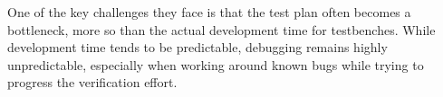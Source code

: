 One of the key challenges they face is that the test plan often becomes a bottleneck, more so than the actual
development time for testbenches. While development time tends to be predictable, debugging remains highly
unpredictable, especially when working around known bugs while trying to progress the verification effort.


